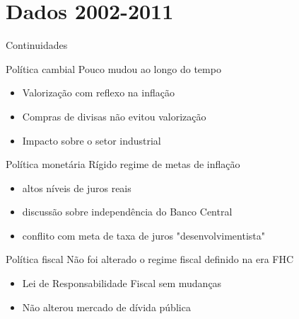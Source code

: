 \documentclass[presentation]{beamer}
\begin{document}
\section{Dados 2002-2011}
\label{sec:org153a6bc}
\begin{frame}[label={sec:orgbebe484}]{Continuidades}
\begin{block}{Política cambial}
Pouco mudou ao longo do tempo

\begin{itemize}
\item Valorização com reflexo na inflação
\item Compras de divisas não evitou valorização
\item Impacto sobre o setor industrial
\end{itemize}
\end{block}

\begin{block}{Política monetária}
Rígido regime de metas de inflação

\begin{itemize}
\item altos níveis de juros reais
\item discussão sobre independência do Banco Central
\item conflito com meta de taxa de juros "desenvolvimentista"
\end{itemize}
\end{block}

\begin{block}{Política fiscal}
Não foi alterado o regime fiscal definido na era FHC

\begin{itemize}
\item Lei de Responsabilidade Fiscal sem mudanças
\item Não alterou mercado de dívida pública
\end{itemize}
\end{block}
\end{frame}
\end{document}
